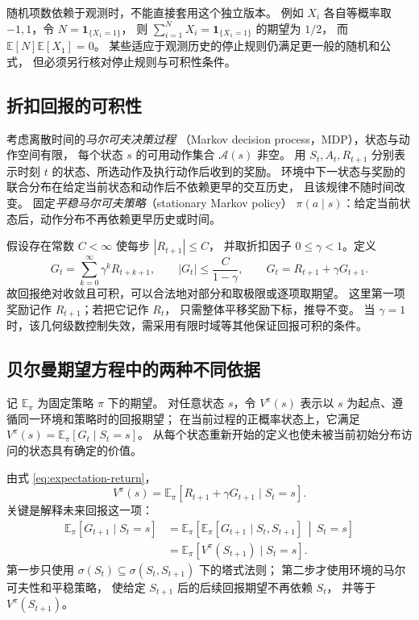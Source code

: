 \documentclass[UTF8,12pt,a4paper,fontset=fandol]{ctexart}
\begin{document}
随机项数依赖于观测时，不能直接套用这个独立版本。
例如 $X_i$ 各自等概率取 $-1,1$，令 $N=\mathbf1_{\{X_1=1\}}$，
则 $\sum_{i=1}^{N}X_i=\mathbf1_{\{X_1=1\}}$ 的期望为 $1/2$，
而 $\mathbb E[N]\mathbb E[X_1]=0$。
某些适应于观测历史的停止规则仍满足更一般的随机和公式，
但必须另行核对停止规则与可积性条件。

\subsection{折扣回报的可积性}

考虑离散时间的\emph{马尔可夫决策过程}
（Markov decision process，MDP），状态与动作空间有限，
每个状态 $s$ 的可用动作集合 $\mathcal A(s)$ 非空。
用 $S_t,A_t,R_{t+1}$ 分别表示时刻 $t$ 的状态、所选动作及执行动作后收到的奖励。
环境中下一状态与奖励的联合分布在给定当前状态和动作后不依赖更早的交互历史，
且该规律不随时间改变。
固定\emph{平稳马尔可夫策略}（stationary Markov policy）
$\pi(a\mid s)$：给定当前状态后，动作分布不再依赖更早历史或时间。

假设存在常数 $C<\infty$ 使每步 $|R_{t+1}|\leq C$，
并取折扣因子 $0\leq\gamma<1$。定义
\begin{equation}
  G_t=\sum_{k=0}^\infty\gamma^kR_{t+k+1},
  \qquad
  |G_t|\leq\frac{C}{1-\gamma},
  \qquad
  G_t=R_{t+1}+\gamma G_{t+1}.
  \label{eq:expectation-return}
\end{equation}
故回报绝对收敛且可积，可以合法地对部分和取极限或逐项取期望。
这里第一项奖励记作 $R_{t+1}$；若把它记作 $R_t$，
只需整体平移奖励下标，推导不变。
当 $\gamma=1$ 时，该几何级数控制失效，需采用有限时域等其他保证回报可积的条件。

\subsection{贝尔曼期望方程中的两种不同依据}

记 $\mathbb E_\pi$ 为固定策略 $\pi$ 下的期望。
对任意状态 $s$，令 $V^\pi(s)$ 表示以 $s$ 为起点、遵循同一环境和策略时的回报期望；
在当前过程的正概率状态上，它满足
$V^\pi(s)=\mathbb E_\pi[G_t\mid S_t=s]$。
从每个状态重新开始的定义也使未被当前初始分布访问的状态具有确定的价值。

由式 \eqref{eq:expectation-return}，
\[
  V^\pi(s)
  =\mathbb E_\pi[R_{t+1}+\gamma G_{t+1}\mid S_t=s].
\]
关键是解释未来回报这一项：
\begin{align}
  \mathbb E_\pi[G_{t+1}\mid S_t=s]
  &=\mathbb E_\pi\!\left[
      \mathbb E_\pi[G_{t+1}\mid S_t,S_{t+1}]
      \,\middle|\,S_t=s\right]
      \label{eq:expectation-bellman-tower}\\
  &=\mathbb E_\pi[V^\pi(S_{t+1})\mid S_t=s].
      \label{eq:expectation-bellman-markov}
\end{align}
第一步只使用
$\sigma(S_t)\subseteq\sigma(S_t,S_{t+1})$ 下的塔式法则；
第二步才使用环境的马尔可夫性和平稳策略，
使给定 $S_{t+1}$ 后的后续回报期望不再依赖 $S_t$，
并等于 $V^\pi(S_{t+1})$。
\end{document}

